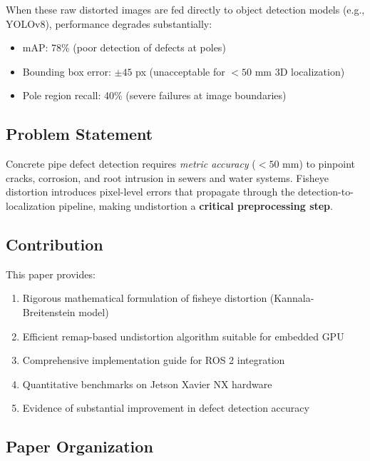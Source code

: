 \documentclass[11pt,a4paper,oneside]{article}
\begin{document}
When these raw distorted images are fed directly to object detection models (e.g., YOLOv8), performance degrades substantially:
\begin{itemize}
    \item mAP: 78\% (poor detection of defects at poles)
    \item Bounding box error: $\pm 45$ px (unacceptable for $<50$ mm 3D localization)
    \item Pole region recall: 40\% (severe failures at image boundaries)
\end{itemize}

\subsection{Problem Statement}

Concrete pipe defect detection requires \textit{metric accuracy} ($<50$ mm) to pinpoint cracks, corrosion, and root intrusion in sewers and water systems. Fisheye distortion introduces pixel-level errors that propagate through the detection-to-localization pipeline, making undistortion a \textbf{critical preprocessing step}.

\subsection{Contribution}

This paper provides:
\begin{enumerate}
    \item Rigorous mathematical formulation of fisheye distortion (Kannala-Breitenstein model)
    \item Efficient remap-based undistortion algorithm suitable for embedded GPU
    \item Comprehensive implementation guide for ROS 2 integration
    \item Quantitative benchmarks on Jetson Xavier NX hardware
    \item Evidence of substantial improvement in defect detection accuracy
\end{enumerate}

\subsection{Paper Organization}
\end{document}
